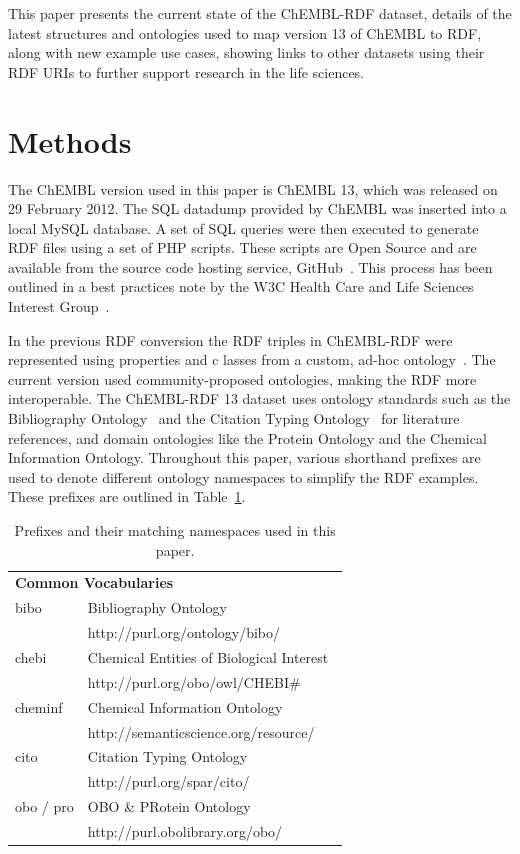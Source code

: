 \documentclass[10pt]{bmc_article}
\newenvironment{bmcformat}{\begin{raggedright}\baselineskip20pt\sloppy\setboolean{publ}{false}}{\end{raggedright}\baselineskip20pt\sloppy}
\begin{document}
\begin{bmcformat}
This paper presents the current state of the ChEMBL-RDF dataset, details of the latest structures
and ontologies used to map version 13 of ChEMBL to RDF, along with new example use cases, showing 
links to other datasets using their RDF URIs to further support research in the life sciences.

\section*{Methods}\label{s2}

The ChEMBL version used in this paper is ChEMBL 13, which was released on 29 February 2012.
The SQL datadump provided by ChEMBL was inserted into a local MySQL database. A set of SQL queries 
were then executed to generate RDF files using a set of PHP scripts. These scripts are Open Source 
and are available from the source code hosting service, GitHub~\cite{ChEMBLRDFGitHub}. This process 
has been outlined in a best practices note by the W3C Health Care and Life Sciences Interest Group~\cite{Marshall2012}.

In the previous RDF conversion the RDF triples in ChEMBL-RDF were represented using properties and c
lasses from a custom, ad-hoc ontology~\cite{Willighagen2011}. The current version used community-proposed
ontologies, making the RDF more interoperable. The ChEMBL-RDF 13 dataset uses ontology
standards such as the Bibliography Ontology~\cite{Giasson2011} and the Citation Typing Ontology~\cite{Hastings2011} for literature
references, and domain ontologies like the Protein Ontology\cite{Sidhu2006} and the Chemical Information
Ontology\cite{Hastings2011}. Throughout this paper, various shorthand prefixes are used to denote different ontology 
namespaces to simplify the RDF examples. These prefixes are outlined in Table~\ref{namespaces}.

\begin{table}
\caption{Prefixes and their matching namespaces used in this paper.} \label{namespaces}
\begin{center}
\begin{tabular}{ll}
\hline
\multicolumn{2}{l}{\textbf{Common Vocabularies}} \\
bibo    & Bibliography Ontology~\cite{Giasson2011} \\
        & http://purl.org/ontology/bibo/ \\
chebi   & Chemical Entities of Biological Interest~\cite{DeMatos2010} \\
        & http://purl.org/obo/owl/CHEBI\# \\
cheminf & Chemical Information Ontology~\cite{Hastings2011} \\
        & http://semanticscience.org/resource/ \\
cito    & Citation Typing Ontology~\cite{Shotton2010} \\
        & http://purl.org/spar/cito/ \\
obo / pro & OBO \& PRotein Ontology~\cite{Sidhu2006} \\
          & http://purl.obolibrary.org/obo/ \\


\end{tabular}
\end{center}
\end{table}
\end{bmcformat}
\end{document}
